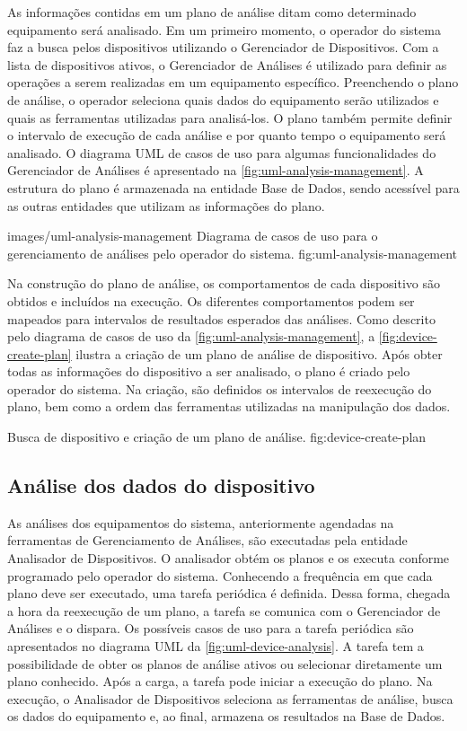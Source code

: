 As informações contidas em um plano de análise ditam como determinado equipamento será analisado. Em
um primeiro momento, o operador do sistema faz a busca pelos dispositivos utilizando o Gerenciador
de Dispositivos. Com a lista de dispositivos ativos, o Gerenciador de Análises é utilizado para
definir as operações a serem realizadas em um equipamento específico. Preenchendo o plano de
análise, o operador seleciona quais dados do equipamento serão utilizados e quais as ferramentas
utilizadas para analisá-los. O plano também permite definir o intervalo de execução de cada análise
e por quanto tempo o equipamento será analisado. O diagrama \gls{UML} de casos de uso para algumas
funcionalidades do Gerenciador de Análises é apresentado na \cref{fig:uml-analysis-management}. A
estrutura do plano é armazenada na entidade Base de Dados, sendo acessível para as outras entidades
que utilizam as informações do plano.

  {images/uml-analysis-management}
  {Diagrama de casos de uso para o gerenciamento de análises pelo operador do sistema.}
  {fig:uml-analysis-management}

Na construção do plano de análise, os comportamentos de cada dispositivo são obtidos e incluídos na
execução. Os diferentes comportamentos podem ser mapeados para intervalos de resultados esperados
das análises. Como descrito pelo diagrama de casos de uso da \cref{fig:uml-analysis-management}, a
\cref{fig:device-create-plan} ilustra a criação de um plano de análise de dispositivo. Após obter
todas as informações do dispositivo a ser analisado, o plano é criado pelo operador do sistema. Na
criação, são definidos os intervalos de reexecução do plano, bem como a ordem das ferramentas
utilizadas na manipulação dos dados.

  {Busca de dispositivo e criação de um plano de análise.}
  {fig:device-create-plan}


\subsection{Análise dos dados do dispositivo}

As análises dos equipamentos do sistema, anteriormente agendadas na ferramentas de Gerenciamento de
Análises, são executadas pela entidade Analisador de Dispositivos. O analisador obtém os planos e os
executa conforme programado pelo operador do sistema. Conhecendo a frequência em que cada plano deve
ser executado, uma tarefa periódica é definida. Dessa forma, chegada a hora da reexecução de um
plano, a tarefa se comunica com o Gerenciador de Análises e o dispara. Os possíveis casos de uso
para a tarefa periódica são apresentados no diagrama \gls{UML} da \cref{fig:uml-device-analysis}. A
tarefa tem a possibilidade de obter os planos de análise ativos ou selecionar diretamente um plano
conhecido. Após a carga, a tarefa pode iniciar a execução do plano. Na execução, o Analisador de
Dispositivos seleciona as ferramentas de análise, busca os dados do equipamento e, ao final,
armazena os resultados na Base de Dados.

